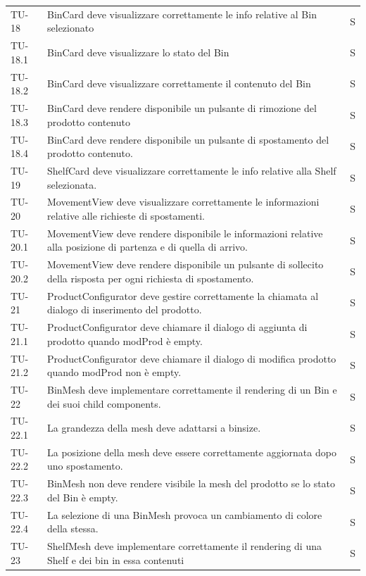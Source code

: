 \begin{xltabular}{0.9\textwidth}{X | p{0.6\textwidth} | p{0.1\textwidth} }
    TU-18 & BinCard deve visualizzare correttamente le info relative al Bin selezionato & S\\
    TU-18.1 & BinCard deve visualizzare lo stato del Bin & S\\
    TU-18.2 & BinCard deve visualizzare correttamente il contenuto del Bin & S\\
    TU-18.3 & BinCard deve rendere disponibile un pulsante di rimozione del prodotto contenuto & S\\
    TU-18.4 & BinCard deve rendere disponibile un pulsante di spostamento del prodotto contenuto. & S\\
    TU-19 & ShelfCard deve visualizzare correttamente le info relative alla Shelf selezionata. & S\\
    TU-20 & MovementView deve visualizzare correttamente le informazioni relative alle richieste di spostamenti. & S\\
    TU-20.1 & MovementView deve rendere disponibile le informazioni relative alla posizione di partenza e di quella di arrivo. & S\\
    TU-20.2 & MovementView deve rendere disponibile un pulsante di sollecito della risposta per ogni richiesta di spostamento. & S\\
    TU-21 & ProductConfigurator deve gestire correttamente la chiamata al dialogo di inserimento del prodotto. & S\\
    TU-21.1 & ProductConfigurator deve chiamare il dialogo di aggiunta di prodotto quando modProd è empty. & S\\
    TU-21.2 & ProductConfigurator deve chiamare il dialogo di modifica prodotto quando modProd non è empty. & S\\
    TU-22 & BinMesh deve implementare correttamente il rendering di un Bin e dei suoi child components. & S\\
    TU-22.1 & La grandezza della mesh deve adattarsi a binsize. & S\\
    TU-22.2 & La posizione della mesh deve essere correttamente aggiornata dopo uno spostamento. & S\\
    TU-22.3 & BinMesh non deve rendere visibile la mesh del prodotto se lo stato del Bin è empty. & S\\
    TU-22.4 & La selezione di una BinMesh provoca un cambiamento di colore della stessa. & S\\
    TU-23 & ShelfMesh deve implementare correttamente il rendering di una Shelf e dei bin in essa contenuti & S\\

    
\end{xltabular}

